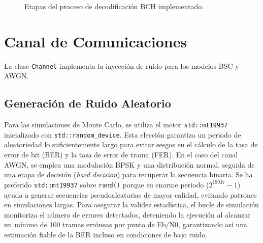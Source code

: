 \begin{figure}[h]
    \centering
    \caption{Etapas del proceso de decodificación BCH implementado.}
    \label{fig:decodificador_pasos}
\end{figure}

\section{Canal de Comunicaciones}
La clase \texttt{Channel} implementa la inyección de ruido para los modelos BSC y AWGN.

\subsection{Generación de Ruido Aleatorio}
Para las simulaciones de Monte Carlo, se utiliza el motor \texttt{std::mt19937} inicializado con \texttt{std::random\_device}. Esta elección garantiza un periodo de aleatoriedad lo suficientemente largo para evitar sesgos en el cálculo de la tasa de error de bit (BER) y la tasa de error de trama (FER). En el caso del canal AWGN, se emplea una modulación BPSK y una distribución normal, seguida de una etapa de decisión (\textit{hard decision}) para recuperar la secuencia binaria. Se ha preferido \texttt{std::mt19937} sobre \texttt{rand()} porque su enorme periodo ($2^{19937}-1$) ayuda a generar secuencias pseudoaleatorias de mayor calidad, evitando patrones en simulaciones largas. Para asegurar la validez estadística, el bucle de simulación monitoriza el número de errores detectados, deteniendo la ejecución al alcanzar un mínimo de 100 tramas erróneas por punto de Eb/N0, garantizando así una estimación fiable de la BER incluso en condiciones de bajo ruido.
